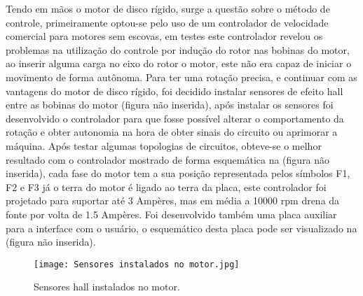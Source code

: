 \documentclass[journal]{IEEEtran}
\begin{document}
Tendo em mãos o motor de disco rígido, surge a questão sobre o método de controle, primeiramente optou-se pelo uso de um controlador de velocidade comercial para motores sem escovas, em testes este controlador revelou os problemas na utilização do controle por indução do rotor nas bobinas do motor, ao inserir alguma carga no eixo do rotor o motor, este não era capaz de iniciar o movimento de forma autônoma.
Para ter uma rotação precisa, e continuar com as vantagens do motor de disco rígido, foi
decidido instalar sensores de efeito hall entre as bobinas do motor (figura não inserida), após instalar os
sensores foi desenvolvido o controlador para que fosse possível alterar o comportamento
da rotação e obter autonomia na hora de obter sinais do circuito ou aprimorar a máquina.
Após testar algumas topologias de circuitos, obteve-se o melhor resultado com o controlador
mostrado de forma esquemática na (figura não inserida), cada fase do motor tem a sua posição
representada pelos símbolos F1, F2 e F3 já o terra do motor é ligado ao terra da placa, este controlador
foi projetado para suportar até 3 Ampères, mas em média a 10000 rpm drena da fonte por volta de
1.5 Ampères. Foi desenvolvido também uma placa auxiliar para a interface com o usuário, o
esquemático desta placa pode ser visualizado na (figura não inserida).




\begin{figure}[!htbp]
\centering
\texttt{[image: Sensores instalados no motor.jpg]}
\caption{Sensores hall instalados no motor.}
\label{fig:sensores_motor}
\end{figure}










% 
% 
% 
% 
% 
\end{document}
